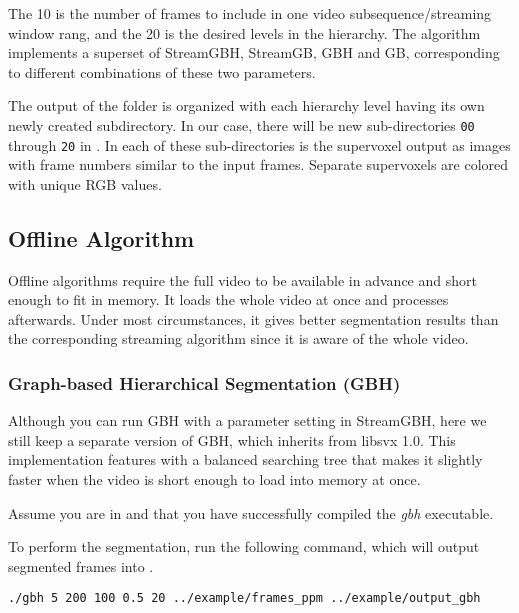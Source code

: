 \documentclass{article}
\begin{document}
The 10 is the number of frames to include in one video subsequence/streaming window rang, and the 20 is the desired levels in the hierarchy. The algorithm implements a superset of StreamGBH, StreamGB, GBH and GB, corresponding to different combinations of these two parameters.

The output of the folder is organized with each hierarchy level having its own newly created subdirectory. In our case, there will be new sub-directories \texttt{00} through \texttt{20} in . In each of these sub-directories is the supervoxel output as images with frame numbers similar to the input frames. Separate supervoxels are colored with unique RGB values.

\subsection{Offline Algorithm}
\label{sec:offline}
Offline algorithms require the full video to be available in advance and short enough to fit in memory. It loads the whole video at once and processes afterwards. Under most circumstances, it gives better segmentation results than the corresponding streaming algorithm since it is aware of the whole video.

\subsubsection{Graph-based Hierarchical Segmentation (GBH)}
\label{sec:gbh}
Although you can run GBH with a parameter setting in StreamGBH, here we still keep a separate version of GBH, which inherits from libsvx 1.0. This implementation features with a balanced searching tree that makes it slightly faster when the video is short enough to load into memory at once.

Assume you are in  and that you have successfully compiled the \textit{gbh} executable.

To perform the segmentation, run the following command, which will output segmented frames into .

\begin{verbatim}
./gbh 5 200 100 0.5 20 ../example/frames_ppm ../example/output_gbh
\end{verbatim}
\end{document}
